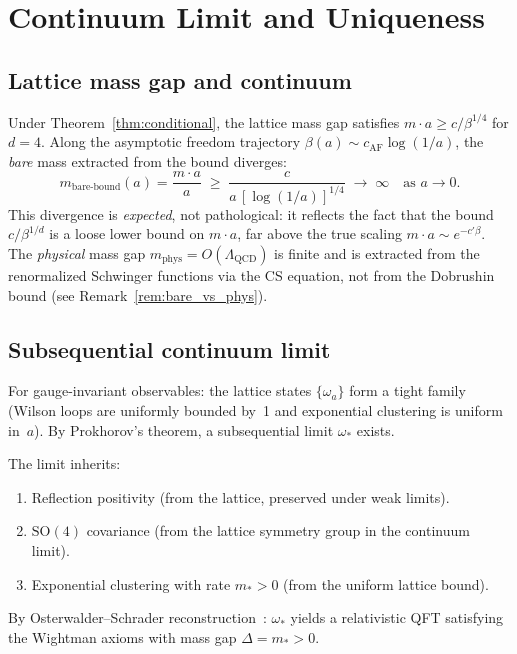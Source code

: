 \documentclass[11pt,a4paper]{article}
\theoremstyle{plain}
\theoremstyle{definition}
\theoremstyle{remark}
\newcommand{\SO}{\mathrm{SO}}
\begin{document}
\section{Continuum Limit and Uniqueness}\label{sec:continuum}

\subsection{Lattice mass gap and continuum}

Under Theorem~\ref{thm:conditional}, the lattice mass gap
satisfies $m \cdot a \geq c / \beta^{1/4}$ for $d = 4$.
Along the asymptotic freedom trajectory
$\beta(a) \sim c_{\mathrm{AF}} \log(1/a)$, the
\emph{bare} mass extracted from the bound diverges:
\begin{equation}
  m_{\mathrm{bare\text{-}bound}}(a)
  = \frac{m \cdot a}{a}
  \;\geq\; \frac{c}{a\,[\log(1/a)]^{1/4}}
  \;\to\; \infty \quad \text{as } a \to 0.
\end{equation}
This divergence is \emph{expected}, not pathological:
it reflects the fact that the bound $c/\beta^{1/d}$
is a loose lower bound on $m \cdot a$, far above the
true scaling $m \cdot a \sim e^{-c'\beta}$.
The \emph{physical} mass gap
$m_{\mathrm{phys}} = O(\Lambda_{\mathrm{QCD}})$
is finite and is extracted from the renormalized
Schwinger functions via the CS equation, not from
the Dobrushin bound (see Remark~\ref{rem:bare_vs_phys}).

\subsection{Subsequential continuum limit}

For gauge-invariant observables: the lattice states
$\{\omega_a\}$ form a tight family (Wilson loops are
uniformly bounded by~1 and exponential clustering is
uniform in~$a$).  By Prokhorov's theorem, a
subsequential limit $\omega_*$ exists.

The limit inherits:
\begin{enumerate}[label=(\roman*),nosep]
  \item Reflection positivity (from the lattice, preserved
    under weak limits).
  \item $\SO(4)$ covariance (from the lattice symmetry
    group in the continuum limit).
  \item Exponential clustering with rate $m_* > 0$
    (from the uniform lattice bound).
\end{enumerate}
By Osterwalder--Schrader
reconstruction~\cite{OsterwalderSchrader}:
$\omega_*$ yields a relativistic QFT satisfying
the Wightman axioms with mass gap $\Delta = m_* > 0$.
\end{document}
